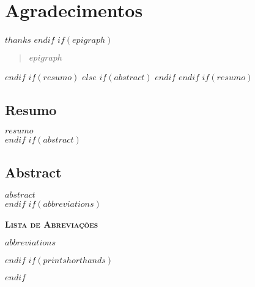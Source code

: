 \chapter*{Agradecimentos}
	$thanks$
{\vfil}{}{}{}
$endif$ $if(epigraph)$
\clearpage \thispagestyle{empty}  
	\begin{quote}\begin{flushright}
		$epigraph$
	\end{flushright}\end{quote} 
{\vfil}{}{}{}
$endif$ $if(resumo)$
\clearpage \thispagestyle{empty}  
$else$ $if(abstract)$
\clearpage \thispagestyle{empty}  
$endif$ $endif$
$if(resumo)$
\section*{Resumo}
$resumo$ \\ $endif$ $if(abstract)$
\section*{Abstract}
$abstract$ \\
{\vfil}{}{}{}
$endif$ $if(abbreviations)$
\clearpage \thispagestyle{empty}  
\begin{center}\textsc{\textbf{Lista de Abreviações}}\end{center}
\begin{multicols}{2}\begin{onehalfspace}\begin{flushleft}
$abbreviations$ \end{flushleft}\end{onehalfspace}\end{multicols}
$endif$ $if(printshorthands)$
\clearpage \thispagestyle{empty}  
\begin{onehalfspace} \printshorthands \end{onehalfspace}
$endif$


\mainmatter
\cleardoublepage
\pagestyle{scrheadings}
\cleardoublepage
